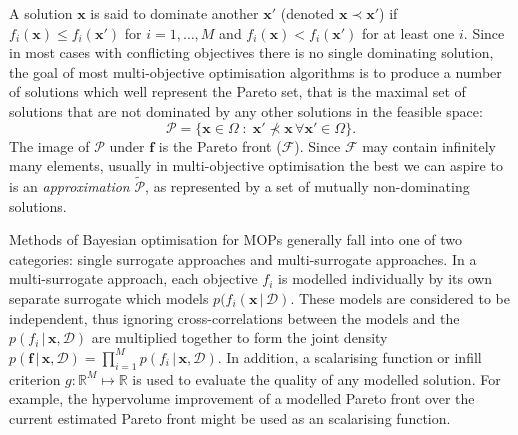 \documentclass[conference]{IEEEtran}
\newcommand{\evaluatedx}{\bX}
\newcommand{\paretofront}{\mathcal{F}}
\newcommand{\paretoset}{\mathcal{P}}
\newcommand{\attainmentfront}{\mathcal{A}}
\newcommand{\attainmentset}{\evaluatedx_{\mathcal{A}}}
\newcommand{\parameterspace}{\Omega}
\newcommand{\nobj}{M}
\newcommand\Papprox{\tilde{\mathcal{P}}}
\newcommand{\given}{\,|\,}
\newcommand{\bx}{\mathbf{x}}
\newcommand{\bX}{\mathbf{X}}
\newcommand{\bff}{\mathbf{f}}
\newcommand{\data}{\mathcal{D}}
\newcommand{\mnote}[2][\textcolor{red}{\dagger}]{$#1$\marginpar{\color{red}\raggedright\tiny$#1$
    #2}}
\begin{document}
A solution $\bx$ is said to dominate another $\bx'$ (denoted $\bx \prec \bx'$) if $f_i(\bx) \le f_i(\bx')$ for $i = 1, \ldots, \nobj$ and $ f_i(\bx) < f_i(\bx')$ for at least one $i$. Since in most cases with conflicting objectives there is no single dominating solution, the goal of most multi-objective optimisation algorithms is to produce a number of solutions which well represent the Pareto set, that is the maximal set of solutions that are not dominated by any other solutions in the feasible space:
\begin{equation}\label{eqn: Pareto_set}
  \paretoset = \{\mathbf{x} \in \parameterspace \;:\;
  \bx' \not\prec \bx \,\forall \bx' \in \parameterspace \}.
\end{equation}
The image of $\paretoset$ under $\bff$ is the Pareto front ($\paretofront$). Since $\paretofront$ may contain infinitely many elements, usually  in multi-objective optimisation the best we can aspire to is an \emph{approximation} $\Papprox$, as represented by a set of mutually non-dominating solutions.



Methods of Bayesian optimisation for MOPs generally fall into one of two categories: single surrogate approaches and multi-surrogate approaches. In a multi-surrogate approach, each objective $f_i$ is modelled individually by its own separate surrogate which models $p(f_i(\bx \given \data)$. These models are  considered to be independent, thus ignoring
cross-correlations between the models and the $p(f_i \given \bx, \data)$ are multiplied together to form the joint density $p(\bff \given \bx, \data) = \prod_{i=1}^\nobj p(f_i \given \bx, \data) $.   In addition, a scalarising function or infill criterion $g : \mathbb{R}^\nobj \mapsto \mathbb{R}$ is used to evaluate the quality of any modelled solution.  For example, the hypervolume improvement of a modelled Pareto front over the current estimated Pareto front might be used as an scalarising function.  
\end{document}

